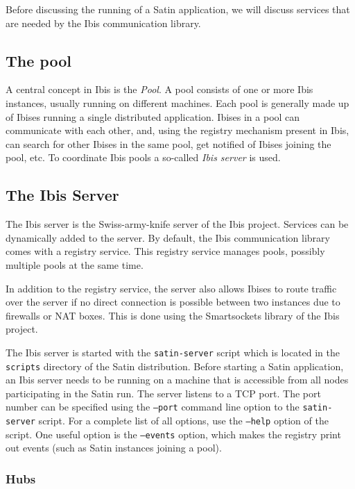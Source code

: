 \documentclass[a4paper,10pt]{article}
\begin{document}
Before discussing
the running of a Satin application, we will discuss services that are
needed by the Ibis communication library.

\subsection{The pool}

A central concept in Ibis is the \emph{Pool}. A pool consists of one or
more Ibis instances, usually running on different machines. Each pool is
generally made up of Ibises running a single distributed application.
Ibises in a pool can communicate with each other, and, using the
registry mechanism present in Ibis, can search for other Ibises in the
same pool, get notified of Ibises joining the pool, etc. To
coordinate Ibis pools a so-called \emph{Ibis server} is used.

\subsection{The Ibis Server}

The Ibis server is the Swiss-army-knife server of the Ibis project.
Services can be dynamically added to the server. By default, the Ibis
communication library comes with a registry service. This registry
service manages pools, possibly multiple pools at the same time.

In addition to the registry service, the server also allows
Ibises to route traffic over the server if no direct connection is
possible between two instances due to firewalls or NAT boxes. This is
done using the Smartsockets library of the Ibis project.

The Ibis server is started with the \texttt{satin-server} script which is
located in the \texttt{scripts} directory of the Satin distribution.  Before
starting a Satin application, an Ibis server needs to be running on a
machine that is accessible from all nodes participating in the Satin run.
The server listens to a TCP port. The port number can be specified using
the \texttt{--port} command line option to the \texttt{satin-server}
script.  For a complete list of all options, use the \texttt{--help}
option of the script. One useful option is the  \texttt{--events}
option, which makes the registry print out events (such as Satin instances
joining a pool).

\subsubsection{Hubs}
\label{hubs}
\end{document}
